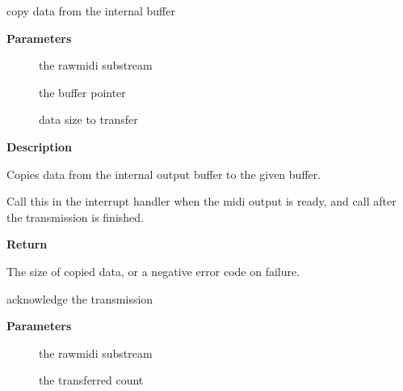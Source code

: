 \documentclass[a4paper,8pt,english]{sphinxmanual}
\begin{document}
\begin{fulllineitems}
\label{sound/kernel-api/alsa-driver-api:c.snd_rawmidi_transmit_peek}
copy data from the internal buffer

\end{fulllineitems}


\textbf{Parameters}
\begin{description}
\item[{}] \leavevmode
the rawmidi substream

\item[{}] \leavevmode
the buffer pointer

\item[{}] \leavevmode
data size to transfer

\end{description}

\textbf{Description}

Copies data from the internal output buffer to the given buffer.

Call this in the interrupt handler when the midi output is ready,
and call  after the transmission is
finished.

\textbf{Return}

The size of copied data, or a negative error code on failure.

\begin{fulllineitems}
\label{sound/kernel-api/alsa-driver-api:c.__snd_rawmidi_transmit_ack}
acknowledge the transmission

\end{fulllineitems}


\textbf{Parameters}
\begin{description}
\item[{}] \leavevmode
the rawmidi substream

\item[{}] \leavevmode
the transferred count

\end{description}
\end{document}
